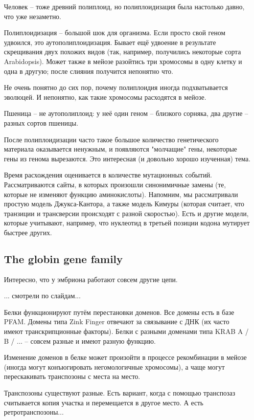 \documentclass[main.tex]{subfiles}
\begin{document}
Человек -- тоже древний полиплоид, но полиплоидизация была настолько давно, что уже незаметно.

Полиплоидизация -- большой шок для организма.
Если просто свой геном удвоился, это аутополиплоидизация.
Бывает ещё удвоение в результате скрещивания двух похожих видов (так, например, получились некоторые сорта Arabidopsis).
Может также в мейозе разойтись три хромосомы в одну клетку и одна в другую; после слияния получится непонятно что.

Не очень понятно до сих пор, почему полиплоидия иногда подхватывается эволюцей.
И непонятно, как такие хромосомы расходятся в мейозе.

Пшеница -- не аутополиплоид: у неё один геном -- близкого сорняка, два другие -- разных сортов пшеницы.

После полиплоидизации часто такое большое количество генетического материала оказывается ненужным, и появляются "молчащие" гены, некоторые гены из генома вырезаются.
Это интересная (и довольно хорошо изученная) тема.

Время расхождения оценивается в количестве мутационных событий.
Рассматриваются сайты, в которых произошли синонимичные замены (те, которые не изменяют функцию аминокислоты).
Напомним, мы рассматривали простую модель Джукса-Кантора, а также модель Кимуры (которая считает, что транзиции и трансверсии происходят с разной скоростью).
Есть и другие модели, которые учитывают, например, что нуклеотид в третьей позиции кодона мутирует быстрее других.

\subsection{The globin gene family}

Интересно, что у эмбриона работают совсем другие цепи.

... смотрели по слайдам...


Белки функционируют путём перестановки доменов.
Все домены есть в базе PFAM.
Домены типа Zink Finger отвечают за связывание с ДНК (их часто имеют транскрипционные факторы).
Белки с разными доменами типа KRAB A / B / ... -- совсем разные и имеют разную функцию.

Изменение доменов в белке может произойти в процессе рекомбинации в мейозе (иногда могут конъюгировать негомологичные хромосомы), а чаще могут перескакивать транспозоны с места на место.
\begin{leftbar}
Транспозоны существуют разные.
Есть вариант, когда с помощью транспозаз считывается копия участка и перемещается в другое место.
А есть ретротранспозоны...
\end{leftbar}
\end{document}
